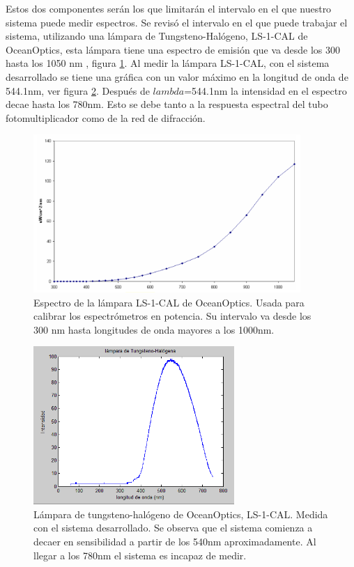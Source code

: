Estos dos componentes serán los que limitarán el intervalo en el que nuestro sistema puede medir espectros. Se revisó el intervalo en el que puede trabajar el sistema, utilizando una lámpara de Tungsteno-Halógeno, LS-1-CAL de OceanOptics, esta lámpara tiene una espectro de emisión que va desde los 300 hasta los 1050 nm \cite{Manual1000}, figura \ref{fig:lamparathd}. %
Al medir la lámpara LS-1-CAL, con el sistema desarrollado se tiene una gráfica con un valor máximo en la longitud de onda de 544.1nm, ver figura \ref{fig:lamparath}. Después de $lambda$=544.1nm la intensidad en el espectro decae hasta los 780nm. Esto se debe tanto a la respuesta espectral del tubo fotomultiplicador como de la red de difracción.
\begin{figure}
	\centering
	\includegraphics[width=1\linewidth,height=6cm]{Imagenes/3/lamparaTH_DPNG}
	\caption{Espectro de la lámpara LS-1-CAL de OceanOptics. Usada para calibrar los espectrómetros en potencia. Su intervalo va desde los 300 nm hasta longitudes de onda mayores a los 1000nm. \cite{Manual1000}}
	\label{fig:lamparathd}
\end{figure}
\begin{figure}
	\centering
	\includegraphics[width=1\linewidth,height=6cm]{Imagenes/3/lamparaTH}
	\caption{Lámpara de tungsteno-halógeno de OceanOptics, LS-1-CAL. Medida con el sistema desarrollado. Se observa que el sistema comienza a decaer en sensibilidad a partir de los 540nm aproximadamente. Al llegar a los 780nm el sistema es incapaz de medir.}
	\label{fig:lamparath}
\end{figure}


